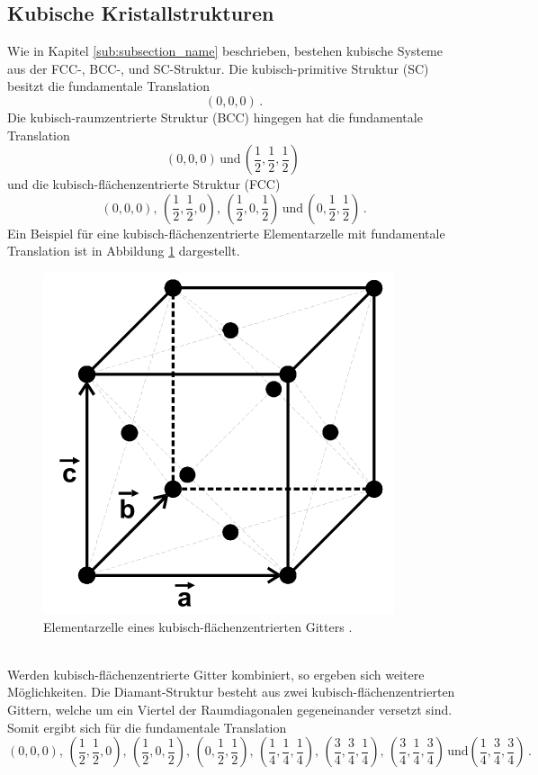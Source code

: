 \subsection{Kubische Kristallstrukturen} %
\label{sub:kubische_kristallstrukturen}

Wie in Kapitel \ref{sub:subsection_name} beschrieben, bestehen kubische Systeme aus der FCC-, BCC-, und SC-Struktur.
Die kubisch-primitive Struktur (SC) besitzt die fundamentale Translation
\begin{equation*}
    \left(0, 0, 0\right)\,.
\end{equation*}
Die kubisch-raumzentrierte Struktur (BCC) hingegen hat die fundamentale Translation
\begin{equation*}
    \left(0, 0, 0\right)\, \text{und}\, \left(\frac{1}{2}, \frac{1}{2}, \frac{1}{2}\right)\,
\end{equation*}
und die kubisch-flächenzentrierte Struktur (FCC)
\begin{equation*}
    \left(0, 0, 0\right),\, \left(\frac{1}{2}, \frac{1}{2}, 0\right),\, \left(\frac{1}{2}, 0, \frac{1}{2}\right)\, \text{und}\, \left(0, \frac{1}{2}, \frac{1}{2}\right)\,.
\end{equation*}
Ein Beispiel für eine kubisch-flächenzentrierte Elementarzelle mit fundamentale Translation ist in Abbildung \ref{fig:FCC} dargestellt.
\begin{figure}[h!]
    \centering
    \includegraphics[width=0.5\linewidth]{images/fcc.png}
    \caption{Elementarzelle eines kubisch-flächenzentrierten Gitters \cite{V41}.}
    \label{fig:FCC}
\end{figure}
\\
Werden kubisch-flächenzentrierte Gitter kombiniert, so ergeben sich weitere Möglichkeiten.
Die Diamant-Struktur besteht aus zwei kubisch-flächenzentrierten Gittern, welche um ein Viertel der Raumdiagonalen gegeneinander versetzt sind.
Somit ergibt sich für die fundamentale Translation
\begin{equation*}
    \left(0, 0, 0\right),\, \left(\frac{1}{2}, \frac{1}{2}, 0\right),\, \left(\frac{1}{2}, 0, \frac{1}{2}\right),\, \left(0, \frac{1}{2}, \frac{1}{2}\right),\, \left(\frac{1}{4}, \frac{1}{4}, \frac{1}{4}\right),\, \left(\frac{3}{4}, \frac{3}{4}, \frac{1}{4}\right),\, \left(\frac{3}{4}, \frac{1}{4}, \frac{3}{4}\right)\, \text{und} \left(\frac{1}{4}, \frac{3}{4}, \frac{3}{4}\right)\,.
\end{equation*}

